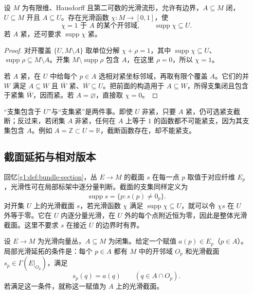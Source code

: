 \begin{corollary}\label{g1:cor:smooth-cutoff-closed}
	设 \(M\) 为有限维、Hausdorff 且第二可数的光滑流形，允许有边界，\(A\subseteq M\) 闭，\(U\subseteq M\) 开且 \(A\subseteq U\)。存在光滑函数 \(\chi:M\to[0,1]\)，使
	\[
		\chi=1\text{ 于 }A\text{ 的某个开邻域},\qquad
		\operatorname{supp}\chi\subseteq U.
	\]
	若 \(A\) 紧，还可要求 \(\operatorname{supp}\chi\) 紧。
\end{corollary}
\begin{proof}
	对开覆盖 \(\{U,M\setminus A\}\) 取单位分解 \(\chi+\rho=1\)，其中 \(\operatorname{supp}\chi\subseteq U\)、\(\operatorname{supp}\rho\subseteq M\setminus A\)。开集 \(M\setminus\operatorname{supp}\rho\) 包含 \(A\)，在这里 \(\rho=0\)，所以 \(\chi=1\)。

	若 \(A\) 紧，在 \(U\) 中给每个 \(p\in A\) 选相对紧坐标邻域，再取有限个覆盖 \(A\)。它们的并 \(W\) 满足 \(A\subseteq W\) 且 \(\overline W\) 紧、\(\overline W\subseteq U\)。把前面的构造用于 \(A\subseteq W\)，所得支集闭且包含于紧集 \(\overline W\)，因而紧。若 \(A=\varnothing\)，直接取 \(\chi=0\)。
\end{proof}

“支集包含于 \(U\)”与“支集紧”是两件事。即使 \(U\) 非紧，只要 \(A\) 紧，仍可选紧支截断；反过来，若闭集 \(A\) 非紧，任何在 \(A\) 上等于 \(1\) 的函数都不可能紧支，因为其支集包含 \(A\)。例如 \(A=\mathbb Z\subset U=\mathbb R\)，截断函数存在，却不能紧支。

\subsection{截面延拓与相对版本}
\label{g1:subsec:1203:03}

回忆\cref{g1:def:bundle-section}，丛 \(E\to M\) 的截面 \(s\) 在每一点 \(p\) 取值于对应纤维 \(E_p\)，光滑性可在局部标架中逐分量判断。截面的支集同样定义为
\[
	\operatorname{supp}s=\overline{\{p:s(p)\ne0_p\}}.
\]
对开集 \(U\) 上的光滑截面 \(s\)，若光滑函数 \(\chi\) 满足 \(\operatorname{supp}\chi\subseteq U\)，就可以令 \(\chi s\) 在 \(U\) 外等于零。它在 \(U\) 内逐分量光滑，在 \(U\) 外的每个点附近恒为零，因此是整体光滑截面。这里不要求 \(s\) 在接近 \(U\) 的边界时有界。

\begin{definition}\label{g1:def:smooth-section-closed-set}
	设 \(E\to M\) 为光滑向量丛，\(A\subseteq M\) 为闭集。给定一个赋值 \(a(p)\in E_p\)（\(p\in A\)）。局部光滑延拓的条件是：每个 \(p\in A\) 都有 \(M\) 中的开邻域 \(O_p\) 和光滑截面 \(s_p\in\Gamma(E|_{O_p})\)，满足
	\[
		s_p(q)=a(q)\qquad(q\in A\cap O_p).
	\]
	若满足这一条件，就称这一赋值为 \(A\) 上的光滑截面。
\end{definition}

